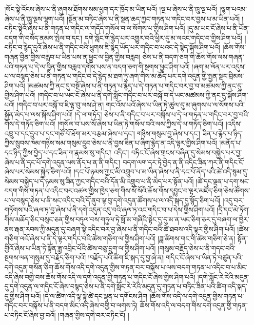 །སོང་སྟེ་འོངས་ཞེས་པ་ནི་ཞུགས་ཐོགས་སམ་ཕྱག་དར་ཁྲོད་མ་ཡིན་པའོ། །ལྔ་པ་ཞེས་པ་ནི་ཁྲུ་ལྔ་པའོ། །ལྷག་པའམ་ཞེས་པ་ནི་ཁྲུ་ལྔས་ལྷག་པའོ། །སྔོན་མ་བཏིང་ཞེས་པ་ནི་སྔན་ཆད་ཀྱང་གཏན་པ་གདིང་བར་བྱས་པ་མ་ཡིན་པའོ། །བཏིང་སྟེའོ་ཞེས་པ་ནི་གཏན་པ་གདིང་ལ་གདོད་གསོལ་བ་ལ་སོགས་པ་གྱིས་ཤིག་པའོ། །དུ་མ་ཡང་ངོ་ཞེས་པ་ནི་ཡོན་བདག་གི་བསོད་ནམས་སྤེལ་བ་དང་། དགེ་སློང་གི་རྙེད་པར་འགྱུར་བའི་ཕྱིར་དུ་མ་ལའང་གདིང་བ་གྱིས་ཤིག་པའོ། །བཏིང་བ་རྙེད་དུའོ་ཞེས་པ་ནི་གདིང་བའི་ཕྲུགས་ཇི་སྙེད་ཡོད་པར་གདིང་བ་པའང་དེ་སྙེད་སྐོས་ཤིག་པའོ། །ཆོས་གོས་གཞན་བྱིན་གྱིས་བརླབ་པ་ཡིན་པས་ན་ཕྱུང་ལ་བྱིན་གྱིས་བརླབ། ཅེས་པ་ནི་བདག་ཅག་གི་ཆོས་གོས་ལས་གཞན་པའི་གཏན་པ་དེ་ལ་བྱིན་གྱིས་བརླབ་དགོས་པས་ན་བདག་ཅག་གི་སྔགས་ཕྱུང་ཤིག་པའོ། །ཞག་མ་ལོན་པར་འདུས་པ་ལ་བསྙད་ཅེས་པ་ནི་གཏན་པ་གདིང་བ་དེ་རྙེད་མ་ཐག་ཏུ་ཞག་གིས་མ་ཆོད་པར་དགེ་འདུན་གྱི་སྤྱན་སྔར་བྲིམས་ཤིག་པའོ། །མཚམས་ཀྱི་ནང་དུ་བསྔོ་ཞེས་པ་ནི་གཏན་པ་རྙེད་པ་དེ་གཏན་པ་གདིང་བར་བྱ་བ་མཚམས་ཀྱི་ནང་དུ་གྱིས་ཤིག་པའོ། །གདིང་བ་པ་ཡང་ངོ་ཞེས་པ་ནི་དགེ་སློང་གདིང་བ་པར་བསྐོ་བ་དེ་ཡང་མཚམས་ཀྱི་ནང་དུ་སྐོས་ཤིག་པའོ། །གདིང་བ་པར་བསྐོ་བ་ཇི་ལྟ་བུ་ལས་ཤེ་ན། གང་འོས་པའོ་ཞེས་པ་ཡིན་ཏེ་ཚུལ་དུ་མ་ཞུགས་པ་ལ་སོགས་པའི་སྐྱོན་མེད་པ་ལས་སྐོས་ཤིག་པའོ། །དེ་ལ་གཏོད། ཅེས་པ་ནི་གདིང་བ་པར་བསྐོས་པ་དེ་ལ་གཏན་པ་གདིང་བར་བྱ་བའི་གོས་དེ་གཏོད་ཅིག་པའོ། །གསོལ་བ་པས་སོ་ཞེས་པ་ཡིན་ཏེ་གསོལ་བའི་ལས་ཀྱིས་དེ་ལ་གཏོད་ཅིག་པའོ། །འདིས་འཁྲུ་བ་དང་དྲུབ་པ་དང་གཙོ་བོ་ཐོག་མར་བརྩམ་ཞེས་པ་དང་། གཉིས་གསུམ་བྱ་ཞེས་པ་དང་། ཟིན་པ་རྙེད་པ་ཉིད་ཀྱིས་སྲུབས་ཁམ་གཉིས་སམ་གསུམ་དྲུབ་ཅེས་པ་ནི་བྱས་ཟིན་པ་ཞིག་རྙེད་ན་འདི་ལྟར་གྱིས་ཤིག་པའོ། །མནོད་པ་དང་ཉིད་ཀྱིས་བྱེད་པ་དང་ཟིན་ཀ་རྣམས་སུ་གདིང་། འདིང་། བཏིང་ངོ་ཞེས་གྲངས་བཞིན་དུ་སེམས་བསྐྱེད་པར་བྱ་ཞེས་པ་ནི་དང་པོ་དགེ་འདུན་ལས་ནོད་པ་ན་ནི་གདིང་། བདག་ལག་དར་ཏེ་བྱེད་ན་ནི་འདིང་ཟིན་ཀར་ནི་གདིང་ངོ་ཞེས་པར་སེམས་སྐྱེད་ཅིག་པའོ། །དང་པོ་ཉམས་ཀྱང་མི་འགྲུབ་པ་མ་ཡིན་ཞེས་པ་ནི་དང་པོ་ནོད་པའི་ཚེ་འདི་སྙམ་དུ་སེམས་བསྐྱེད་པ་དེ་ཉམས་སུ་ཟིན་ཀྱང་གདིང་བའི་དོན་མི་འགྲུབ་པ་ནི་མེད་པར་སྟོན་པའོ། །ཚེ་དང་ལྡན་པ་དག་སང་བདག་གིས་གཏན་པ་འདིང་བར་འཚལ་གྱིས་ཁྱེད་ཅག་གིས་སོ་སོའི་ཆོས་གོས་དབྱུང་བ་ལྟར་མཛོད་ཅིག་ཅེས་ཚོགས་པ་ལ་བསྙད་ཅེས་པ་ནི་སང་འདིང་བའི་དོ་ནུབ་ལྟ་བུ་དགེ་འདུན་ཚོགས་པ་ལ་འདི་སྐད་དུ་སྙོད་ཅིག་པའོ། །འདུ་བར་གཏོགས་པའི་ཞལ་ཏ་བྱ་ཞེས་པ་ནི་དགེ་འདུན་འདུ་བའི་ཞལ་ཏ་འང་གདིང་བ་པ་དེས་གྱིས་ཤིག་པའོ། །དྲི་དང་མེ་ཏོག་གིས་མཆོད་ཅིང་བསུང་ཅན་གྱིས་བཏུལ་བས་གཏུལ་ཏེ་སློ་མ་གཞིའི་སྟེང་དུ་དུ་མ་ན་ཡང་ཅིག་ཅར་དུ་བཞག་ལ་ཁྱེར་ནས་རྒན་རབས་ཀྱི་མདུན་དུ་བཞག་སྟེ་འདིང་བར་བྱ་ཞེས་པ་ནི་གདིང་བའི་ཚེ་ཐབས་འདི་ལྟར་གྱིས་ཤིག་པའོ། །ཚེས་གཅིག་ལའོ་ཞེས་པ་ནི་དེ་ལྟར་གདིང་བའི་ཚེས་གཅིག་ལ་གྱིས་ཤིག་པའོ། །ཟླ་ཚིགས་གང་གི་ཚེས་གཅིག་ཅེ་ན། སྟོན་གྱིའོ་ཞེས་པ་ཡིན་ཏེ་སྟོན་ཟླ་འབྲིང་པོའི་ཚེས་བཅུ་དྲུག་ལ་གྱིས་ཤིག་པའོ། །གསུམ་བརྗོད་ཅེས་པ་ནི་གདང་བའི་སྔགས་ལན་གསུམ་དུ་བརྗོད་ཅིག་པའོ། །བརྗོད་པའི་ཚིག་ཇི་སྐད་དུ་བྱ་ཞེ་ན། གདིང་ངོ་ཞེས་པ་ཡིན་ཏེ་བཙུན་པའི་དགེ་འདུན་གསོན་ཅིག་ཆོས་གོས་འདི་དགེ་འདུན་གྱིས་གཏན་བར་བསྐོས་པ་ལས་བདག་གཏན་པ་འདིང་བ་པ་མིང་འདི་ཞེས་བགྱི་བས་ཆོས་གོས་འདི་ལ་དགེ་འདུན་གྱི་གཏན་པ་གདིང་ངོ་ཞེས་གྱིས་ཤིག་པའོ། །དགེ་སློང་རེ་རེའི་མདུན་དུ་དགེ་འདུན་ལ་གདིང་ངོ་ཞེས་བསྙད་ཅེས་པ་ནི་དགེ་སློང་རེ་རེའི་མདུན་དུ་གཏན་པ་བཏིང་ཟིན་པའི་ཚིག་འདི་སྐད་དུ་གྱིས་ཤིག་པའོ། །དེ་ལ་ཚིག་འདི་ལྟ་སྟེ་ཚེ་དང་ལྡན་པ་དགོངས་ཤིག །ཆོས་གོས་འདི་ལ་དགེ་འདུན་གྱིས་གཏན་པ་གདིང་བར་བསྐོས་པ་ནི་བདག་མིང་འདི་ཞེས་བགྱི་བ་ལགས་ཏེ། ཆོས་གོས་འདི་ལ་བདག་གིས་དགེ་འདུན་གྱི་གཏན་པ་བཏིང་ངོ་ཞེས་བྱ་བའོ། །གཞན་གྱིས་དགེ་བར་བཏིང་ངོ། །
